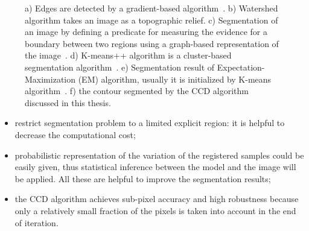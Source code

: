 \begin{figure}[htbp]
\begin{minipage}[t]{0.5\linewidth}
  \end{minipage} 
  \begin{minipage}[t]{0.5\linewidth} 
    \centering 
  \end{minipage}
  \begin{minipage}[t]{0.5\linewidth} 
    \centering 
  \end{minipage}%
\caption[Resulting images after applying some segmentation methods]{a)
  Edges are detected by a gradient-based algorithm~\cite{scharr2000optimal}. b) Watershed algorithm takes an image as a
  topographic relief. c) Segmentation of an image by defining a predicate for
  measuring the evidence for a boundary between two regions using a
  graph-based representation of the
  image~\cite{felzenszwalb2004efficient}. d) K-means++ algorithm is a
  cluster-based segmentation algorithm~\cite{arthur2007k}. e)
  Segmentation result of Expectation-Maximization (EM) algorithm,
  usually it is initialized by K-means algorithm~\cite{bishop2006pattern}. f) the contour segmented by the CCD
  algorithm discussed in this thesis.}
\label{fig:seg_comparison}
\end{figure}

\begin{itemize}
\item restrict segmentation problem to a limited explicit region: it is helpful
  to decrease the computational cost;
\item probabilistic representation of the variation of the registered
  samples could be easily given, thus statistical inference between
  the model and the image will be applied. All these are helpful to
  improve the segmentation results;
\item the CCD algorithm achieves sub-pixel accuracy and high
  robustness because only a relatively small fraction of the pixels is
  taken into account in the end of iteration.
\end{itemize}

